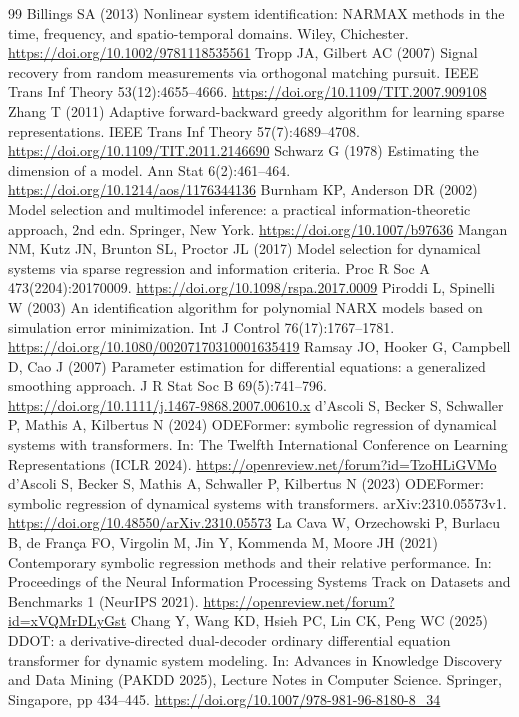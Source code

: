 \documentclass[10pt]{article}
\begin{document}
\begin{thebibliography}{99}
 Billings SA (2013) Nonlinear system identification: NARMAX methods in the time, frequency, and spatio-temporal domains. Wiley, Chichester. \url{https://doi.org/10.1002/9781118535561}
 Tropp JA, Gilbert AC (2007) Signal recovery from random measurements via orthogonal matching pursuit. IEEE Trans Inf Theory 53(12):4655--4666. \url{https://doi.org/10.1109/TIT.2007.909108}
 Zhang T (2011) Adaptive forward-backward greedy algorithm for learning sparse representations. IEEE Trans Inf Theory 57(7):4689--4708. \url{https://doi.org/10.1109/TIT.2011.2146690}
 Schwarz G (1978) Estimating the dimension of a model. Ann Stat 6(2):461--464. \url{https://doi.org/10.1214/aos/1176344136}
 Burnham KP, Anderson DR (2002) Model selection and multimodel inference: a practical information-theoretic approach, 2nd edn. Springer, New York. \url{https://doi.org/10.1007/b97636}
 Mangan NM, Kutz JN, Brunton SL, Proctor JL (2017) Model selection for dynamical systems via sparse regression and information criteria. Proc R Soc A 473(2204):20170009. \url{https://doi.org/10.1098/rspa.2017.0009}
 Piroddi L, Spinelli W (2003) An identification algorithm for polynomial NARX models based on simulation error minimization. Int J Control 76(17):1767--1781. \url{https://doi.org/10.1080/00207170310001635419}
 Ramsay JO, Hooker G, Campbell D, Cao J (2007) Parameter estimation for differential equations: a generalized smoothing approach. J R Stat Soc B 69(5):741--796. \url{https://doi.org/10.1111/j.1467-9868.2007.00610.x}
 d'Ascoli S, Becker S, Schwaller P, Mathis A, Kilbertus N (2024) ODEFormer: symbolic regression of dynamical systems with transformers. In: The Twelfth International Conference on Learning Representations (ICLR 2024). \url{https://openreview.net/forum?id=TzoHLiGVMo}
 d'Ascoli S, Becker S, Mathis A, Schwaller P, Kilbertus N (2023) ODEFormer: symbolic regression of dynamical systems with transformers. arXiv:2310.05573v1. \url{https://doi.org/10.48550/arXiv.2310.05573}
 La Cava W, Orzechowski P, Burlacu B, de Fran{\c c}a FO, Virgolin M, Jin Y, Kommenda M, Moore JH (2021) Contemporary symbolic regression methods and their relative performance. In: Proceedings of the Neural Information Processing Systems Track on Datasets and Benchmarks 1 (NeurIPS 2021). \url{https://openreview.net/forum?id=xVQMrDLyGst}
 Chang Y, Wang KD, Hsieh PC, Lin CK, Peng WC (2025) DDOT: a derivative-directed dual-decoder ordinary differential equation transformer for dynamic system modeling. In: Advances in Knowledge Discovery and Data Mining (PAKDD 2025), Lecture Notes in Computer Science. Springer, Singapore, pp 434--445. \url{https://doi.org/10.1007/978-981-96-8180-8_34}

\end{thebibliography}
\end{document}
